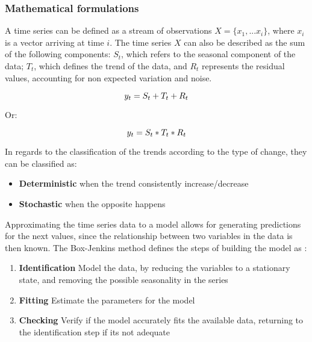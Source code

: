 \subsubsection {Mathematical formulations} \label{sec:math_form}

A time series can be defined as a stream of observations $X = \{x_1, ... x_i\}$, where $x_i$ is a vector arriving at time $i$. The time series $X$ can also be
described as the sum of the following components: $S_t$, which refers to the seasonal component of the data; $T_t$, which defines the trend of the data, and $R_t$
represents the residual values, accounting for non expected variation and noise.

\begin {equation*}
\centering
y_t = S_t + T_t + R_t
\end {equation*}

Or:

\begin {equation*}
\centering
y_t = S_t * T_t * R_t
\end {equation*}

\par In regards to the classification of the trends according to the type of change, they can be classified as:

\begin {itemize}
  \item \textbf {Deterministic} when the trend consistently increase/decrease
  \item \textbf {Stochastic} when the opposite happens
\end {itemize}

\par Approximating the time series data to a model allows for generating predictions for the next values, since the relationship between two variables in the data is
then known. The Box-Jenkins method defines the steps of building the model as \cite{box_time_2016}:

\begin {enumerate}
  \item \textbf{Identification} Model the data, by reducing the variables to a stationary state, and removing the possible seasonality in the series
  \item \textbf{Fitting} Estimate the parameters for the model
  \item \textbf{Checking} Verify if the model accurately fits the available data, returning to the identification step if its not adequate
\end {enumerate}

